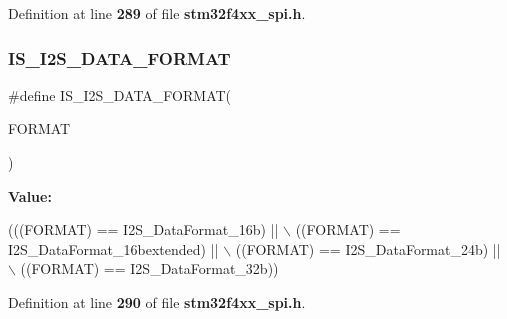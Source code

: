 Definition at line \textbf{ 289} of file \textbf{ stm32f4xx\+\_\+spi.\+h}.

\mbox{\label{group__SPI__I2S__Data__Format_gac467da829eca4a5c4ce41a6abd2d8e81}} 
\subsubsection{I\+S\+\_\+\+I2\+S\+\_\+\+D\+A\+T\+A\+\_\+\+F\+O\+R\+M\+AT}
{\footnotesize\ttfamily \#define I\+S\+\_\+\+I2\+S\+\_\+\+D\+A\+T\+A\+\_\+\+F\+O\+R\+M\+AT(\begin{DoxyParamCaption}\item[{}]{F\+O\+R\+M\+AT }\end{DoxyParamCaption})}

{\bfseries Value\+:}
\begin{DoxyCode}
(((FORMAT) == I2S_DataFormat_16b) || \(\backslash\)
                                    ((FORMAT) == I2S_DataFormat_16bextended) || \(\backslash\)
                                    ((FORMAT) == I2S_DataFormat_24b) || \(\backslash\)
                                    ((FORMAT) == I2S_DataFormat_32b))
\end{DoxyCode}


Definition at line \textbf{ 290} of file \textbf{ stm32f4xx\+\_\+spi.\+h}.

